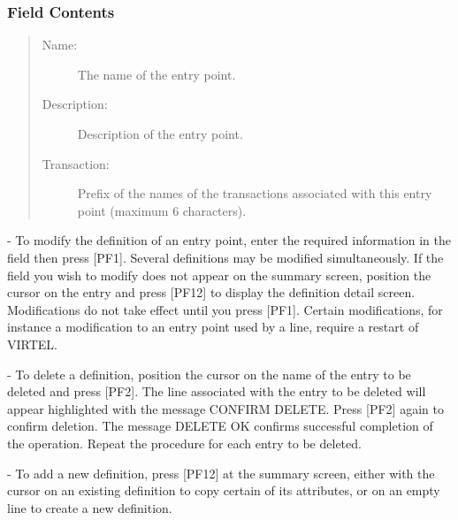 \documentclass[letterpaper,10pt,english]{sphinxmanual}
\begin{document}
\subsubsection{Field Contents}
\label{\detokenize{connectivity_guide:field-contents}}\begin{quote}
\begin{description}
\item[{Name:}] \leavevmode
The name of the entry point.

\item[{Description:}] \leavevmode
Description of the entry point.

\item[{Transaction:}] \leavevmode
Prefix of the names of the transactions associated with this entry point (maximum 6 characters).

\end{description}
\end{quote}

 - To modify the definition of an entry point, enter the required information in the field then press {[}PF1{]}. Several definitions may be modified simultaneously. If the field you wish to modify does not appear on the summary screen, position the cursor on the entry and press {[}PF12{]} to display the definition detail screen. Modifications do not take effect until you press {[}PF1{]}. Certain modifications, for instance a modification to an entry point used by a line, require a restart of VIRTEL.

 - To delete a definition, position the cursor on the name of the entry to be deleted and press {[}PF2{]}. The line associated with the entry to be deleted will appear highlighted with the message CONFIRM DELETE. Press {[}PF2{]} again to confirm deletion. The message DELETE OK confirms successful completion of the operation. Repeat the procedure for each entry to be deleted.

 - To add a new definition, press {[}PF12{]} at the summary screen, either with the cursor on an existing definition to copy certain of its attributes, or on an empty line to create a new definition.

\ignorespaces 
\end{document}
